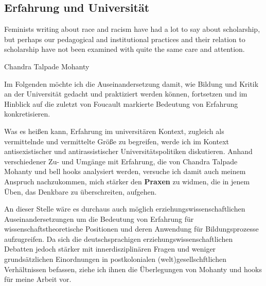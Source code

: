 \subsection{Erfahrung und Universität}
\epigraph{ 
 Feminists writing about race and racism have had a lot to 
say about scholarship, but perhaps our pedagogical and institutional practices and their relation to scholarship have not been examined with quite the same care and attention. 
  }{Chandra Talpade Mohanty\footnotemark}  

Im Folgenden möchte ich die Auseinandersetzung damit, wie Bildung und Kritik
an der Universität gedacht und praktiziert werden können, fortsetzen und im
Hinblick auf die zuletzt von Foucault markierte Bedeutung von Erfahrung
konkretisieren.

Was es heißen kann, Erfahrung im universitären Kontext, zugleich als
vermittelnde und vermittelte Größe zu begreifen, werde ich im Kontext
antisexistischer und antirassistischer Universitätspolitiken diskutieren.
Anhand verschiedener Zu- und Umgänge mit Erfahrung, die von Chandra Talpade
Mohanty und bell hooks analysiert werden, versuche ich damit auch meinem
Anspruch nachzukommen, mich stärker den \textbf{Praxen} zu widmen, die in jenem Üben,
das Denkbare zu überschreiten, aufgehen. 

An dieser Stelle wäre es durchaus auch
möglich  erziehungswissenschaftlichen Auseinandersetzungen um die Bedeutung von
Erfahrung für wissenschaftstheoretische Positionen und deren Anwendung für
Bildungsprozesse  aufzugreifen. Da sich die deutschsprachigen
erziehungswissenschaftlichen Debatten\footnotemark {} jedoch stärker mit innerdisziplinären Fragen und
weniger grundsätzlichen Einordnungen in postkolonialen (welt)gesellschftlichen
Verhältnissen befassen, ziehe ich ihnen die Überlegungen von  Mohanty und hooks
für meine Arbeit vor.
\\

